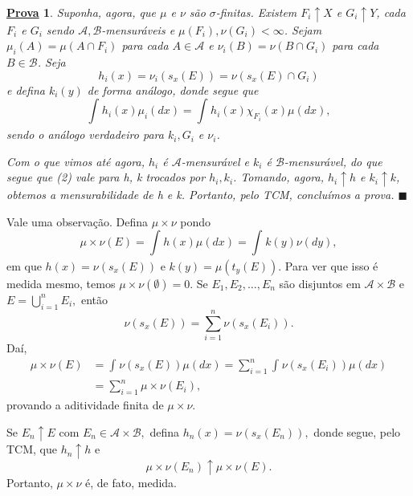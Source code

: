 \documentclass{article}
\newtheorem*{proof*}{\underline{Prova}}
\renewcommand\qedsymbol{$\blacksquare$}
\begin{document}
\begin{proof*}
  Suponha, agora, que \(\mu \) e \(\nu\) são \(\sigma \)-finitas. Existem \(F_{i}\uparrow X\) e \(G_{i}\uparrow Y\), cada \(F_{i}\) e \(G_{i}\) sendo \(\mathcal{A}, \mathcal{B}\)-mensuráveis e \(\mu (F_{i}), \nu(G_{i})< \infty\).
Sejam \(\mu_{i}(A) = \mu (A\cap F_{i})\) para cada \(A\in \mathcal{A}\) e \(\nu_{i}(B) = \nu(B\cap G_{i})\) para cada \(B\in \mathcal{B}\). Seja 
  \[
    h_{i}(x) = \nu_{i}(s_x(E)) = \nu(s_x(E)\cap G_{i})
  \]
  e defina \(k_{i}(y)\) de forma análogo, donde segue que 
    \[
      \int_{}h_{i}(x)\mu_{i}( dx) = \int_{}h_{i}(x)\chi_{F_{i}}(x)\mu ( dx),
    \]
  sendo o análogo verdadeiro para \(k_{i}, G_{i}\) e \(\nu_{i}\).

  Com o que vimos até agora, \(h_{i}\) é \(\mathcal{A}\)-mensurável e \(k_{i}\) é \(\mathcal{B}\)-mensurável, do que segue que (2) vale para h, k trocados por \(h_{i}, k_{i}\). Tomando, agora, 
  \(h_{i}\uparrow h\) e \(k_{i}\uparrow k\), obtemos a mensurabilidade de h e k. Portanto, pelo TCM, concluímos a prova. \qedsymbol
\end{proof*}
  Vale uma observação. Defina \(\mu \times \nu\) pondo 
    \[
      \mu \times \nu (E) = \int_{}h(x)\mu ( dx) = \int_{}k(y)\nu( dy),
    \]
  em que \(h(x) =\nu(s_x(E)) \) e \(k(y) = \mu(t_y(E)).\) Para ver que isso é medida mesmo, temos \(\mu \times \nu(\emptyset ) = 0\). Se \(E_1, E_2, \dotsc , E_{n}\) são disjuntos em \(\mathcal{A}\times \mathcal{B}\) e \(E = \bigcup_{i=1}^{n}E_{i},\) então 
    \[
      \nu(s_x(E)) = \sum\limits_{i=1}^{n}\nu(s_x(E_{i})).
    \]
    Daí, 
   \begin{align*}
     \mu \times \nu(E) &= \int_{}\nu(s_x(E))\mu ( dx) = \sum\limits_{i=1}^{n}\int_{}\nu(s_x(E_{i})) \mu(dx) \\ 
                       &= \sum\limits_{i=1}^{n}\mu \times \nu (E_{i}),
   \end{align*}
   provando a aditividade finita de \(\mu \times \nu\).

   Se \(E_{n}\uparrow E\) com \(E_{n}\in \mathcal{A}\times \mathcal{B},\) defina \(h_{n}(x) = \nu(s_x(E_{n})),\) donde segue, pelo TCM, que \(h_{n}\uparrow h\) e 
     \[
       \mu \times \nu(E_{n})\uparrow \mu \times \nu(E).
     \]
  Portanto, \(\mu \times \nu\) é, de fato, medida. 
\end{document}
